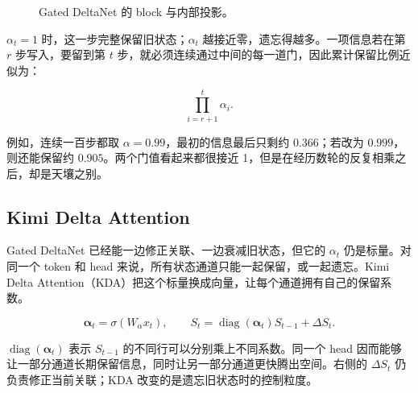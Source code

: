 \begin{figure}[htbp]
\caption{Gated DeltaNet 的 block 与内部投影。}
\label{fig:ch02-gated-delta}
\end{figure}

$\alpha_t=1$ 时，这一步完整保留旧状态；$\alpha_t$ 越接近零，遗忘得越多。一项信息若在第 $r$ 步写入，要留到第 $t$ 步，就必须连续通过中间的每一道门，因此累计保留比例近似为：

\[
\prod_{i=r+1}^{t}\alpha_i.
\]

例如，连续一百步都取 $\alpha=0.99$，最初的信息最后只剩约 $0.366$；若改为 $0.999$，则还能保留约 $0.905$。两个门值看起来都很接近 1，但是在经历数轮的反复相乘之后，却是天壤之别。

\subsection{Kimi Delta Attention}

Gated DeltaNet 已经能一边修正关联、一边衰减旧状态，但它的 $\alpha_t$ 仍是标量。对同一个 token 和 head 来说，所有状态通道只能一起保留，或一起遗忘。Kimi Delta Attention（KDA）把这个标量换成向量，让每个通道拥有自己的保留系数。\cite{kimi-linear}

\[
\boldsymbol{\alpha}_t
=\sigma(W_\alpha x_t),
\qquad
S_t=
\operatorname{diag}(\boldsymbol{\alpha}_t)S_{t-1}
+\Delta S_t.
\]

$\operatorname{diag}(\boldsymbol{\alpha}_t)$ 表示 $S_{t-1}$ 的不同行可以分别乘上不同系数。同一个 head 因而能够让一部分通道长期保留信息，同时让另一部分通道更快腾出空间。右侧的 $\Delta S_t$ 仍负责修正当前关联；KDA 改变的是遗忘旧状态时的控制粒度。

